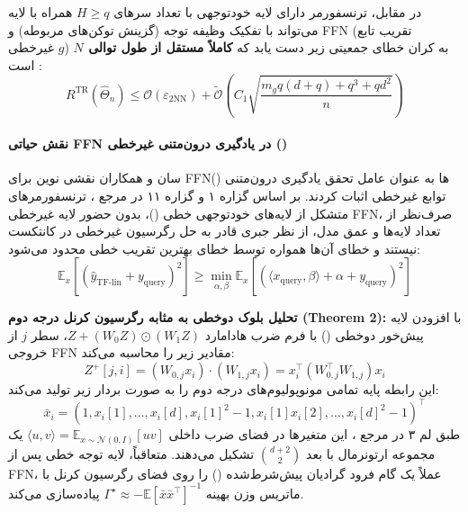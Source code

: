 در مقابل، ترنسفورمر دارای لایه خودتوجهی با تعداد سرهای $H \ge q$ همراه با لایه  می‌تواند با تفکیک وظیفه توجه (گزینش توکن‌های مربوطه) و FFN (تقریب تابع غیرخطی $g$) به کران خطای جمعیتی زیر دست یابد که \textbf{کاملاً مستقل از طول توالی $N$} است \cite{mousavihosseini2025transformers}:
\begin{equation}
    R^{\text{TR}}(\hat{\Theta}_n) \le \mathcal{O}(\varepsilon_{\text{2NN}}) + \tilde{\mathcal{O}} \left( C_1 \sqrt{\frac{m_g q(d+q) + q^3 + qd^2}{n}} \right)
\end{equation}

\paragraph*{نقش حیاتی FFN در یادگیری درون‌متنی غیرخطی ()}
سان و همکاران \cite{sun2025role} نقشی نوین برای FFNها به عنوان عامل تحقق یادگیری درون‌متنی () توابع غیرخطی اثبات کردند. 
بر اساس گزاره ۱ و گزاره ۱۱ در مرجع \cite{sun2025role}، ترنسفورمرهای متشکل از لایه‌های خودتوجهی خطی ()، بدون حضور لایه غیرخطی FFN، صرف‌نظر از تعداد لایه‌ها و عمق مدل، از نظر جبری قادر به حل رگرسیون غیرخطی در کانتکست نیستند و خطای آن‌ها همواره توسط خطای بهترین تقریب خطی محدود می‌شود:
\begin{equation}
    \mathbb{E}_x \left[ (\hat{y}_{\text{TF-lin}} + y_{\text{query}})^2 \right] \ge \min_{\alpha, \beta} \mathbb{E}_x \left[ (\langle x_{\text{query}}, \beta \rangle + \alpha + y_{\text{query}})^2 \right]
\end{equation}

\textbf{تحلیل بلوک دوخطی به مثابه رگرسیون کرنل درجه دوم (Theorem 2):}
با افزودن لایه پیش‌خور دوخطی () با فرم ضرب هادامارد $Z + (W_0 Z) \odot (W_1 Z)$، سطر $j$ از خروجی FFN مقادیر زیر را محاسبه می‌کند:
\begin{equation}
    Z^+[j, i] = (W_{0,j} x_i) \cdot (W_{1,j} x_i) = x_i^\top (W_{0,j}^\top W_{1,j}) x_i
\end{equation}
این رابطه پایه تمامی مونوپولیوم‌های درجه دوم را به صورت بردار زیر تولید می‌کند:
\begin{equation}
    \bar{x}_i = \left( 1, x_i[1], \dots, x_i[d], x_i[1]^2 - 1, x_i[1]x_i[2], \dots, x_i[d]^2 - 1 \right)^\top
\end{equation}
طبق لم ۳ در مرجع \cite{sun2025role}، این متغیرها در فضای ضرب داخلی $\langle u, v \rangle = \mathbb{E}_{x \sim \mathcal{N}(0, I)}[uv]$ یک مجموعه ارتونرمال با بعد $\binom{d+2}{2}$ تشکیل می‌دهند. متعاقباً، لایه توجه خطی پس از FFN، عملاً یک گام فرود گرادیان پیش‌شرط‌شده () را روی فضای رگرسیون کرنل با ماتریس وزن بهینه $\Gamma^\star \approx -\mathbb{E}[\bar{x}\bar{x}^\top]^{-1}$ پیاده‌سازی می‌کند.

